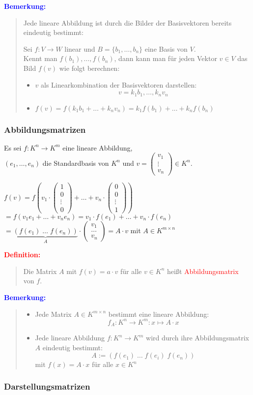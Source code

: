 \documentclass{article}
\newcommand{\red}[1]{\textcolor{red}{#1}}
\newcommand{\blue}[1]{\textcolor{blue}{#1}}
\newcommand{\de}[1]{\red{\textbf{Definition: }}\begin{quote}#1\end{quote}}
\newcommand{\an}[1]{\blue{\textbf{Bemerkung: }}\begin{quote}#1\end{quote}}
\newcommand{\vvvec}[3]{\begin{pmatrix}#1\\#2\\#3\end{pmatrix}}
\newcommand{\vfec}[4]{\begin{pmatrix}#1\\#2\\#3\\#4\end{pmatrix}}
\begin{document}
\newpage
\an{
    Jede lineare Abbildung ist durch die Bilder der Basisvektoren bereits eindeutig bestimmt:

    Sei $f: V \to W$ linear und $B = \{b_1, \dots, b_n\}$ eine Basis von $V$.\\
    Kennt man $f(b_1), \dots, f(b_n)$, dann kann man für jeden Vektor $v \in V$ das Bild $f(v)$ wie folgt berechnen:

    \begin{itemize}
        \item $v$ als Linearkombination der Basisvektoren darstellen:
        $$v = k_1b_1, \dots, k_nv_n$$
        \item $f(v) = f(k_1b_1 + \dots + k_nv_n) = k_1f(b_1) + \dots + k_nf(b_n)$
    \end{itemize}
}

\subsubsection{Abbildungsmatrizen}

Es sei $f: K^n \to K^m$ eine lineare Abbildung,\\
$(e_1, \dots, e_n)$ die Standardbasis von $K^n$ und $v = \vvvec{v_1}{\vdots}{v_n} \in K^n$.

$f(v) = f(v_1 \cdot \vfec{1}{0}{\vdots}{0} + \dots + v_n \cdot \vfec{0}{0}{\vdots}{1})$\\
\phantom{$f(v)$} $= f(v_1e_1 + \dots + v_ne_n) = v_1 \cdot f(e_1) + \dots + v_n \cdot f(e_n)$\\
\phantom{$f(v)$} $= \underbrace{(f(e_1) \; \dots \; f(e_n))}_A \cdot \vvvec{v_1}{\dots}{v_n} = A \cdot v$ mit $A \in K^{m \times n}$

\de{
    Die Matrix $A$ mit $f(v) = a \cdot v$ für alle $v \in K^n$ heißt \red{Abbildungsmatrix} von $f$.
}

\an{
    \begin{itemize}
        \item Jede Matrix $A \in K^{m \times n}$ bestimmt eine lineare Abbildung:
        $$f_A: K^n \to K^m: x \mapsto A \cdot x$$
        \item Jede lineare Abbildung $f: K^n \to K^m$ wird durch ihre Abbildungsmatrix $A$ eindeutig bestimmt:
        $$A := (f(e_1) \; \dots \; f(e_i) \; f(e_n))$$
        mit $f(x) = A \cdot x$ für alle $x \in K^n$
    \end{itemize}
}

\subsubsection{Darstellungsmatrizen}
\end{document}
